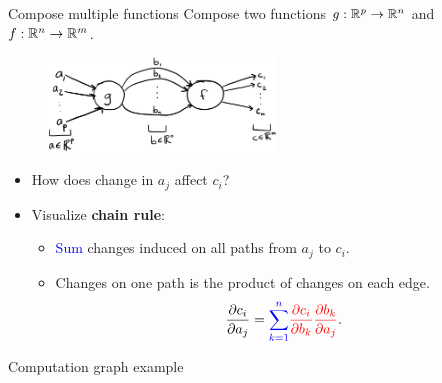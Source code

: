 \documentclass[usenames,dvipsnames,notes]{beamer}
\begin{document}
\begin{frame}
{Compose multiple functions}
Compose two functions $g:\mathbb{R}^{p}\to\mathbb{R}^{n}$ and $f:\mathbb{R}^{n}\to\mathbb{R}^{m}$.
\begin{figure}
\includegraphics[height=2.5cm]{figures/two-fn-comp-graph-partials}
\end{figure}

\begin{itemize}
\item How does change in $a_j$ affect $c_i$?
\item Visualize \textbf{chain rule}:
\begin{itemize}
\item \textcolor{blue}{Sum} changes induced on all paths from $a_j$ to $c_i$.
\item Changes on one path is the {\color{red}product} of changes on each edge.
\[
\frac{\partial c_{i}}{\partial a_{j}}={\color{blue}\sum_{k=1}^{n}}
{\color{red} \frac{\partial c_{i}}{\partial b_{k}}\frac{\partial b_{k}}{\partial a_{j}}} .
\]
\end{itemize} 
\end{itemize}
\end{frame}

\begin{frame}
    {Computation graph example}
\end{frame}
\end{document}
